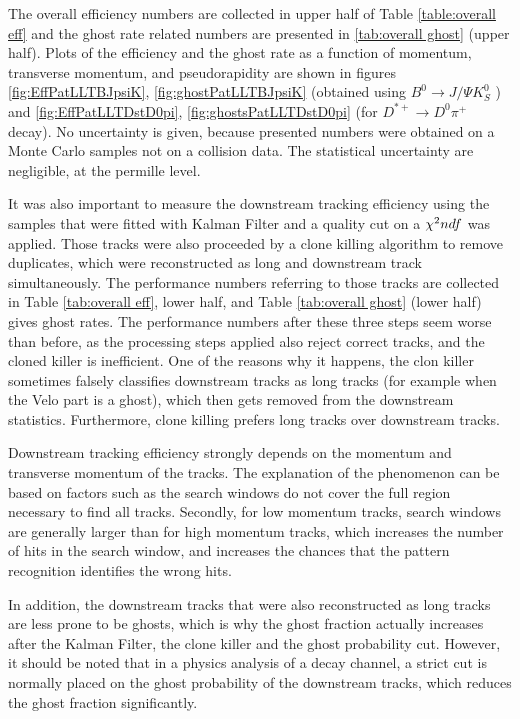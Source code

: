 The overall efficiency numbers are collected in upper half of Table \ref{table:overall eff} and the ghost rate related numbers are presented in \ref{tab:overall ghost} (upper half). Plots of the efficiency and the ghost rate as a function of momentum, transverse momentum, and pseudorapidity are shown in 
figures \ref{fig:EffPatLLTBJpsiK}, \ref{fig:ghostPatLLTBJpsiK}  (obtained using  $B^{0} \rightarrow J/\Psi K^{0}_{S}$ ) and \ref{fig:EffPatLLTDstD0pi}, \ref{fig:ghostsPatLLTDstD0pi} (for $D^{*+} \rightarrow D^{0}\pi^+$ decay). No uncertainty is given, because presented numbers were obtained on a Monte Carlo samples not on a collision data. The statistical uncertainty are negligible, at the permille level.  

It was also important to measure the downstream tracking efficiency using the samples that were fitted with Kalman Filter and a quality cut on a $\chi^2\/ndf$ was applied. Those tracks were also proceeded by a clone killing algorithm to remove duplicates, which were reconstructed as long and downstream track simultaneously. The performance numbers referring to those tracks are collected in Table \ref{tab:overall eff}, lower half, and Table \ref{tab:overall ghost} (lower half) gives ghost rates. The performance numbers after these three steps seem worse than before, as the processing steps applied also reject correct tracks, and the cloned killer is inefficient. One of the reasons why it happens, the clon killer sometimes falsely classifies downstream tracks as long
tracks (for example when the Velo part is a ghost), which then gets removed from the downstream statistics. Furthermore, clone killing prefers long tracks over downstream tracks. 

Downstream tracking efficiency strongly depends on the momentum and transverse momentum of the tracks. The explanation of the phenomenon can be based on factors such as the search windows do not cover the full region necessary to find all tracks. Secondly, for low momentum tracks, search windows are generally larger than for high momentum tracks, which increases the number of hits in the search window, and increases the chances that the pattern recognition identifies the wrong hits.

In addition, the downstream tracks that were also reconstructed as long tracks
are less prone to be ghosts, which is why the ghost fraction actually increases
after the Kalman Filter, the clone killer and the ghost probability cut. However, it should be noted that
in a physics analysis of a decay channel, a strict cut is normally placed on the ghost probability of the downstream tracks, which reduces the ghost fraction
significantly.


